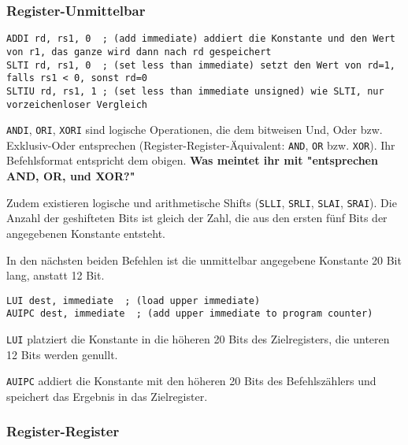 \subsubsection{Register-Unmittelbar}

\begin{lstlisting}[style=risc-v_Assembler]
ADDI rd, rs1, 0  ; (add immediate) addiert die Konstante und den Wert von r1, das ganze wird dann nach rd gespeichert
SLTI rd, rs1, 0  ; (set less than immediate) setzt den Wert von rd=1, falls rs1 < 0, sonst rd=0
SLTIU rd, rs1, 1 ; (set less than immediate unsigned) wie SLTI, nur vorzeichenloser Vergleich
\end{lstlisting}

\lstinline[style=risc-v_Assembler]!ANDI!, \lstinline[style=risc-v_Assembler]!ORI!, \lstinline[style=risc-v_Assembler]!XORI! sind logische Operationen, die dem bitweisen Und, Oder bzw. Exklusiv-Oder entsprechen (Register-Register-Äquivalent: \lstinline[style=risc-v_Assembler]!AND!, \lstinline[style=risc-v_Assembler]!OR! bzw. \lstinline[style=risc-v_Assembler]!XOR!). Ihr
Befehlsformat entspricht dem obigen. \textbf{Was meintet ihr mit "entsprechen AND, OR, und XOR?"}

Zudem existieren logische und arithmetische Shifts (\lstinline[style=risc-v_Assembler]!SLLI!, \lstinline[style=risc-v_Assembler]!SRLI!, \lstinline[style=risc-v_Assembler]!SLAI!, \lstinline[style=risc-v_Assembler]!SRAI!). Die Anzahl
der geshifteten Bits ist gleich der Zahl, die aus den ersten fünf Bits der angegebenen Konstante entsteht.

In den nächsten beiden Befehlen ist die unmittelbar angegebene Konstante 20 Bit lang, anstatt 12 Bit.

\begin{lstlisting}[style=risc-v_Assembler]
LUI dest, immediate  ; (load upper immediate)
AUIPC dest, immediate  ; (add upper immediate to program counter)
\end{lstlisting}

\lstinline[style=risc-v_Assembler]!LUI! platziert die Konstante in die höheren 20 Bits des Zielregisters, die unteren 12 Bits werden genullt.

\lstinline[style=risc-v_Assembler]!AUIPC! addiert die Konstante mit den höheren 20 Bits des Befehlszählers und speichert das Ergebnis in das Zielregister.

\subsubsection{Register-Register}

